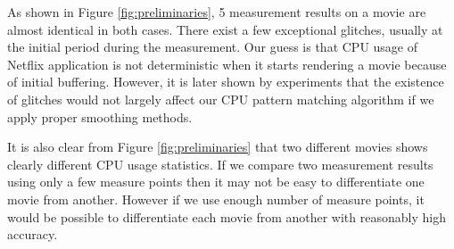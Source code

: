 As shown in Figure \ref{fig:preliminaries}, 5 measurement results on a movie are almost identical in both cases. 
There exist a few exceptional glitches, usually at the initial period during the measurement. 
Our guess is that CPU usage of Netflix application is not deterministic when it starts rendering a movie because of initial buffering.
However, it is later shown by experiments that the existence of glitches would not largely affect our CPU pattern matching algorithm if we apply proper smoothing methods. 

It is also clear from Figure \ref{fig:preliminaries} that two different movies shows clearly different CPU usage statistics. 
If we compare two measurement results using only a few measure points then it may not be easy to differentiate one movie from another.
However if we use enough number of measure points, it would be possible to differentiate each movie from another with reasonably high accuracy. 


